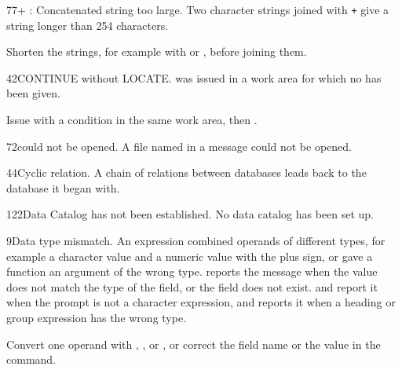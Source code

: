 \begin{XbaseMessageEntry}{77}{+ : Concatenated string too large.}
Two character strings joined with \texttt{+} give a string longer than 254 characters.

Shorten the strings, for example with  or , before joining them.
\end{XbaseMessageEntry}

\begin{XbaseMessageEntry}{42}{CONTINUE without LOCATE.}
 was issued in a work area for which no  has been given.

Issue  with a condition in the same work area, then .
\end{XbaseMessageEntry}

\begin{XbaseMessageEntry}{72}{could not be opened.}
A file named in a message could not be opened.
\end{XbaseMessageEntry}

\begin{XbaseMessageEntry}{44}{Cyclic relation.}
A chain of relations between databases leads back to the database it began with.
\end{XbaseMessageEntry}

\begin{XbaseMessageEntry}{122}{Data Catalog has not been established.}
No data catalog has been set up.
\end{XbaseMessageEntry}

\begin{XbaseMessageEntry}{9}{Data type mismatch.}
An expression combined operands of different types, for example a character value and a numeric value with the plus sign, or gave a function an argument of the wrong type.  reports the message when the value does not match the type of the field, or the field does not exist.  and  report it when the prompt is not a character expression, and  reports it when a heading or group expression has the wrong type.

Convert one operand with , ,  or , or correct the field name or the value in the command.
\end{XbaseMessageEntry}

